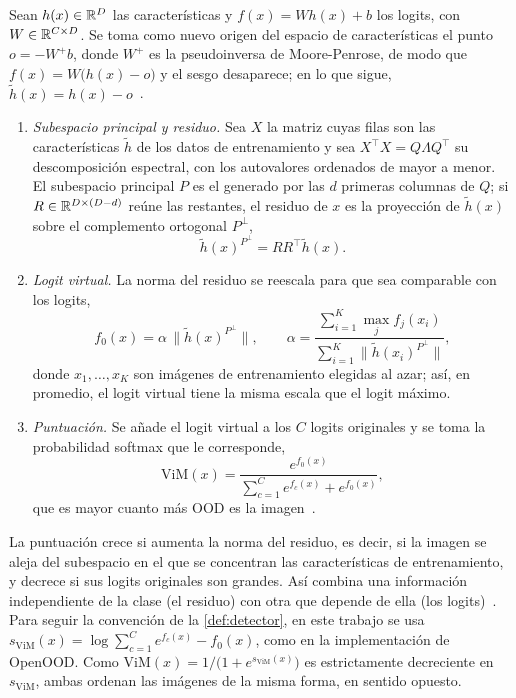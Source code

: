 \begin{definicion}[ViM]\label{def:vim}
Sean $h(x) \in \mathbb{R}^D$ las características y $f(x) = W h(x) + b$ los logits, con $W \in \mathbb{R}^{C \times D}$. Se toma como nuevo origen del espacio de características el punto $o = -W^{+} b$, donde $W^{+}$ es la pseudoinversa de Moore-Penrose, de modo que $f(x) = W\bigl(h(x) - o\bigr)$ y el sesgo desaparece; en lo que sigue, $\tilde h(x) = h(x) - o$~\cite[sec.~3, ec.~(1)]{wang2022vim}.
\begin{enumerate}
  \item \emph{Subespacio principal y residuo.} Sea $X$ la matriz cuyas filas son las características $\tilde h$ de los datos de entrenamiento y sea $X^{\top} X = Q \Lambda Q^{\top}$ su descomposición espectral, con los autovalores ordenados de mayor a menor. El subespacio principal $P$ es el generado por las $d$ primeras columnas de $Q$; si $R \in \mathbb{R}^{D \times (D - d)}$ reúne las restantes, el residuo de $x$ es la proyección de $\tilde h(x)$ sobre el complemento ortogonal $P^{\perp}$,
  \[
    \tilde h(x)^{P^{\perp}} = R R^{\top} \tilde h(x).
  \]
  \item \emph{Logit virtual.} La norma del residuo se reescala para que sea comparable con los logits,
  \[
    f_0(x) = \alpha \,\bigl\| \tilde h(x)^{P^{\perp}} \bigr\|, \qquad
    \alpha = \frac{\sum_{i=1}^{K} \max_{j} f_j(x_i)}{\sum_{i=1}^{K} \bigl\| \tilde h(x_i)^{P^{\perp}} \bigr\|},
  \]
  donde $x_1, \dots, x_K$ son imágenes de entrenamiento elegidas al azar; así, en promedio, el logit virtual tiene la misma escala que el logit máximo.
  \item \emph{Puntuación.} Se añade el logit virtual a los $C$ logits originales y se toma la probabilidad softmax que le corresponde,
  \[
    \mathrm{ViM}(x) = \frac{e^{f_0(x)}}{\sum_{c=1}^{C} e^{f_c(x)} + e^{f_0(x)}},
  \]
  que es mayor cuanto más OOD es la imagen~\cite[sec.~4, ecs.~(4)--(7)]{wang2022vim}.
\end{enumerate}
\end{definicion}

La puntuación crece si aumenta la norma del residuo, es decir, si la imagen se aleja del subespacio en el que se concentran las características de entrenamiento, y decrece si sus logits originales son grandes. Así combina una información independiente de la clase (el residuo) con otra que depende de ella (los logits)~\cite[sec.~4]{wang2022vim}. Para seguir la convención de la \cref{def:detector}, en este trabajo se usa $s_{\mathrm{ViM}}(x) = \log \sum_{c=1}^{C} e^{f_c(x)} - f_0(x)$, como en la implementación de OpenOOD. Como $\mathrm{ViM}(x) = 1 / \bigl(1 + e^{s_{\mathrm{ViM}}(x)}\bigr)$ es estrictamente decreciente en $s_{\mathrm{ViM}}$, ambas ordenan las imágenes de la misma forma, en sentido opuesto.


